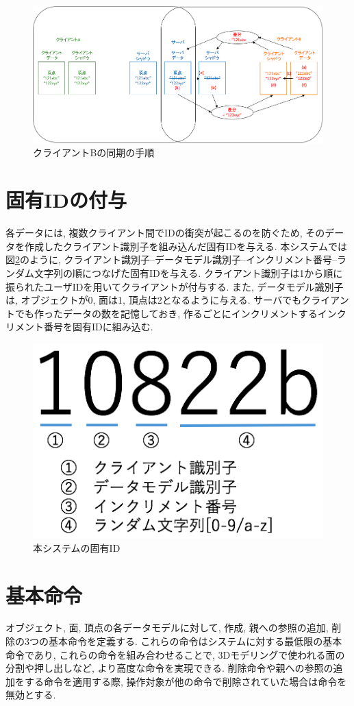 \begin{figure}[htbp]
  \begin{center}
    \includegraphics[scale=0.3]{images/sycle2}
    \caption{クライアントBの同期の手順}
    \label{sycle2}
  \end{center}
\end{figure}
\section{固有IDの付与} \label{固有id}
各データには, 複数クライアント間でIDの衝突が起こるのを防ぐため, そのデータを作成したクライアント識別子を組み込んだ固有IDを与える.
本システムでは図\ref{uuid}のように, クライアント識別子--データモデル識別子--インクリメント番号--ランダム文字列の順につなげた固有IDを与える. クライアント識別子は1から順に振られたユーザIDを用いてクライアントが付与する. また, データモデル識別子は, オブジェクトが0, 面は1, 頂点は2となるように与える. サーバでもクライアントでも作ったデータの数を記憶しておき, 作るごとにインクリメントするインクリメント番号を固有IDに組み込む.
\begin{figure}[htbp]
  \begin{center}
    \includegraphics[scale=0.5]{images/uuid}
    \caption{本システムの固有ID}
    \label{uuid}
  \end{center}
\end{figure}
\section{基本命令} \label{ope}
オブジェクト, 面, 頂点の各データモデルに対して, 作成, 親への参照の追加, 削除の3つの基本命令を定義する.
これらの命令はシステムに対する最低限の基本命令であり, これらの命令を組み合わせることで, 3Dモデリングで使われる面の分割や押し出しなど, より高度な命令を実現できる.
削除命令や親への参照の追加をする命令を適用する際, 操作対象が他の命令で削除されていた場合は命令を無効とする.
